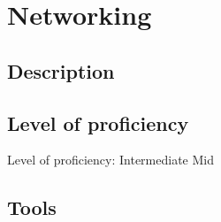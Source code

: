 \section{Networking}

\subsection{Description}

\subsection{Level of proficiency}

Level of proficiency: Intermediate Mid

\subsection{Tools}

